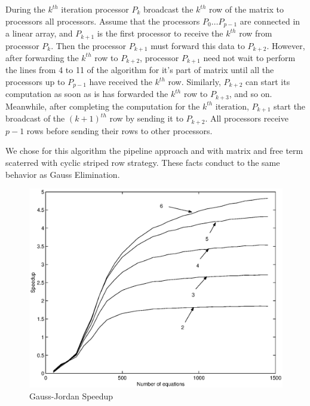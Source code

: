 \documentclass[times,10pt,twocolumn]{article}
\begin{document}

During the $k^{th}$ iteration processor $P_{k}$ broadcast the
$k^{th}$ row of the matrix to processors all processors. Assume
that the processors $P_0\ldots P_{p-1}$ are connected in a linear
array, and $P_{k+1}$ is the first processor to receive the
$k^{th}$ row from processor $P_{k}$. Then the processor $P_{k+1}$
must forward this data to $P_{k+2}$. However, after forwarding the
$k^{th}$ row to $P_{k+2}$, processor $P_{k+1}$ need not wait to
perform the lines from 4 to 11 of the algorithm for it's part of
matrix until all the processors up to $P_{p-1}$ have received the
$k^{th}$ row. Similarly, $P_{k+2}$ can start its computation as
soon as is has forwarded the $k^{th}$ row to $P_{k+3}$, and so on.
Meanwhile, after completing the computation for the $k^{th}$
iteration, $P_{k+1}$ start the broadcast of the $(k+1)^{th}$ row
by sending it to $P_{k+2}$. All processors receive $p-1$ rows
before sending their rows to other processors.

We chose for this algorithm the pipeline approach and with matrix
and free term scaterred with cyclic striped row strategy. These
facts conduct to the same  behavior as Gauss Elimination.

\begin{figure}[h]
   \includegraphics[scale=0.44]{gj-mpich2-bw.eps}
   \caption{Gauss-Jordan Speedup}
\end{figure}

\end{document}
